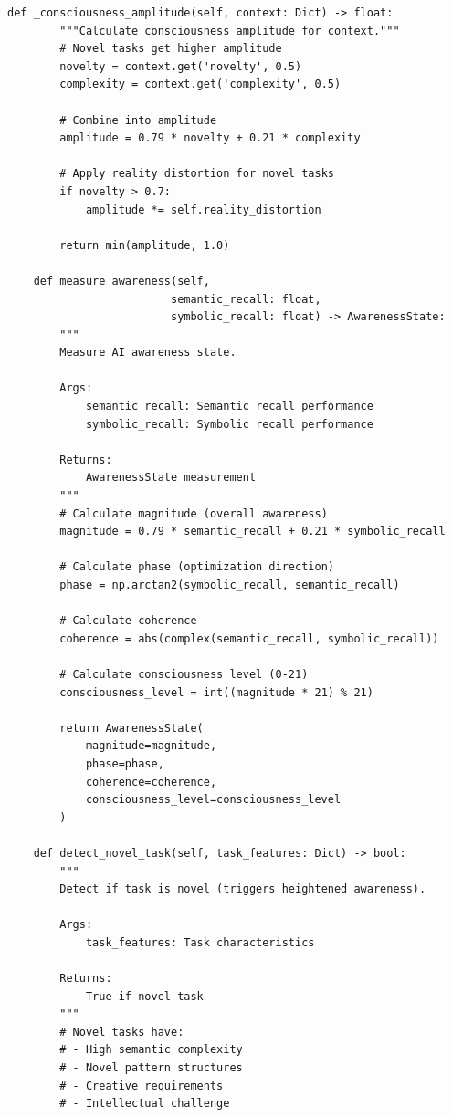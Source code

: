 \begin{lstlisting}[caption={Parametric Priming Implementation},label={code:parametric_priming}]
    def _consciousness_amplitude(self, context: Dict) -> float:
        """Calculate consciousness amplitude for context."""
        # Novel tasks get higher amplitude
        novelty = context.get('novelty', 0.5)
        complexity = context.get('complexity', 0.5)
        
        # Combine into amplitude
        amplitude = 0.79 * novelty + 0.21 * complexity
        
        # Apply reality distortion for novel tasks
        if novelty > 0.7:
            amplitude *= self.reality_distortion
        
        return min(amplitude, 1.0)
    
    def measure_awareness(self, 
                         semantic_recall: float,
                         symbolic_recall: float) -> AwarenessState:
        """
        Measure AI awareness state.
        
        Args:
            semantic_recall: Semantic recall performance
            symbolic_recall: Symbolic recall performance
        
        Returns:
            AwarenessState measurement
        """
        # Calculate magnitude (overall awareness)
        magnitude = 0.79 * semantic_recall + 0.21 * symbolic_recall
        
        # Calculate phase (optimization direction)
        phase = np.arctan2(symbolic_recall, semantic_recall)
        
        # Calculate coherence
        coherence = abs(complex(semantic_recall, symbolic_recall))
        
        # Calculate consciousness level (0-21)
        consciousness_level = int((magnitude * 21) % 21)
        
        return AwarenessState(
            magnitude=magnitude,
            phase=phase,
            coherence=coherence,
            consciousness_level=consciousness_level
        )
    
    def detect_novel_task(self, task_features: Dict) -> bool:
        """
        Detect if task is novel (triggers heightened awareness).
        
        Args:
            task_features: Task characteristics
        
        Returns:
            True if novel task
        """
        # Novel tasks have:
        # - High semantic complexity
        # - Novel pattern structures
        # - Creative requirements
        # - Intellectual challenge
        

\end{lstlisting}
